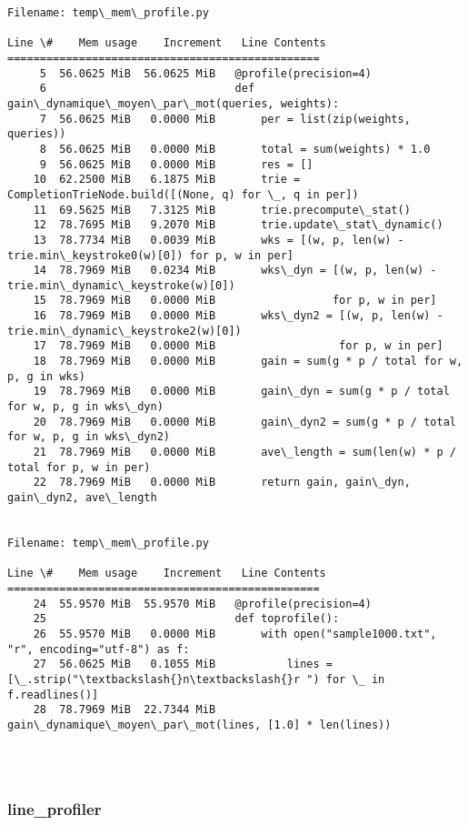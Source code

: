 \documentclass[11pt]{article}
\begin{document}
    \begin{Verbatim}[commandchars=\\\{\}]
Filename: temp\_mem\_profile.py

Line \#    Mem usage    Increment   Line Contents
================================================
     5  56.0625 MiB  56.0625 MiB   @profile(precision=4)
     6                             def gain\_dynamique\_moyen\_par\_mot(queries, weights):
     7  56.0625 MiB   0.0000 MiB       per = list(zip(weights, queries))
     8  56.0625 MiB   0.0000 MiB       total = sum(weights) * 1.0
     9  56.0625 MiB   0.0000 MiB       res = []
    10  62.2500 MiB   6.1875 MiB       trie = CompletionTrieNode.build([(None, q) for \_, q in per])
    11  69.5625 MiB   7.3125 MiB       trie.precompute\_stat()
    12  78.7695 MiB   9.2070 MiB       trie.update\_stat\_dynamic()
    13  78.7734 MiB   0.0039 MiB       wks = [(w, p, len(w) - trie.min\_keystroke0(w)[0]) for p, w in per]
    14  78.7969 MiB   0.0234 MiB       wks\_dyn = [(w, p, len(w) - trie.min\_dynamic\_keystroke(w)[0])
    15  78.7969 MiB   0.0000 MiB                  for p, w in per]
    16  78.7969 MiB   0.0000 MiB       wks\_dyn2 = [(w, p, len(w) - trie.min\_dynamic\_keystroke2(w)[0])
    17  78.7969 MiB   0.0000 MiB                   for p, w in per]
    18  78.7969 MiB   0.0000 MiB       gain = sum(g * p / total for w, p, g in wks)
    19  78.7969 MiB   0.0000 MiB       gain\_dyn = sum(g * p / total for w, p, g in wks\_dyn)
    20  78.7969 MiB   0.0000 MiB       gain\_dyn2 = sum(g * p / total for w, p, g in wks\_dyn2)
    21  78.7969 MiB   0.0000 MiB       ave\_length = sum(len(w) * p / total for p, w in per)
    22  78.7969 MiB   0.0000 MiB       return gain, gain\_dyn, gain\_dyn2, ave\_length


Filename: temp\_mem\_profile.py

Line \#    Mem usage    Increment   Line Contents
================================================
    24  55.9570 MiB  55.9570 MiB   @profile(precision=4)
    25                             def toprofile():
    26  55.9570 MiB   0.0000 MiB       with open("sample1000.txt", "r", encoding="utf-8") as f:
    27  56.0625 MiB   0.1055 MiB           lines = [\_.strip("\textbackslash{}n\textbackslash{}r ") for \_ in f.readlines()]
    28  78.7969 MiB  22.7344 MiB       gain\_dynamique\_moyen\_par\_mot(lines, [1.0] * len(lines))




    \end{Verbatim}

    \subsubsection{line\_profiler}\label{line_profiler}
\end{document}

